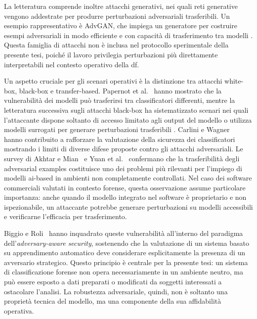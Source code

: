 La letteratura comprende inoltre attacchi generativi, nei quali reti generative
vengono addestrate per produrre perturbazioni adversariali trasferibili. Un
esempio rappresentativo è AdvGAN, che impiega un generatore per costruire esempi
adversariali in modo efficiente e con capacità di trasferimento tra modelli
\cite{xia2018advgan}. Questa famiglia di attacchi non è inclusa nel protocollo
sperimentale della presente tesi, poiché il lavoro privilegia perturbazioni più
direttamente interpretabili nel contesto operativo della \gls{df}.

Un aspetto cruciale per gli scenari operativi è la distinzione tra attacchi
white-box, black-box e transfer-based. Papernot et
al.~\cite{papernot2016limitations} hanno mostrato che la vulnerabilità dei
modelli può trasferirsi tra classificatori differenti, mentre la letteratura
successiva sugli attacchi black-box ha sistematizzato scenari nei quali
l'attaccante dispone soltanto di accesso limitato agli output del modello o
utilizza modelli surrogati per generare perturbazioni trasferibili
\cite{bhambri2020survey}. Carlini e Wagner~\cite{carlini2017towards} hanno
contribuito a rafforzare la valutazione della sicurezza dei classificatori
mostrando i limiti di diverse difese proposte contro gli attacchi
adversariali. Le survey di Akhtar e Mian~\cite{akhtar2018threat} e Yuan et
al.~\cite{yuan2019adversarial} confermano che la trasferibilità degli
adversarial examples costituisce uno dei problemi più rilevanti per l'impiego di
modelli \gls{ai}-based in ambienti non completamente controllati. Nel caso dei
software commerciali valutati in contesto forense, questa osservazione assume
particolare importanza: anche quando il modello integrato nel software è
proprietario e non ispezionabile, un attaccante potrebbe generare perturbazioni
su modelli accessibili e verificarne l'efficacia per trasferimento.

Biggio e Roli~\cite{biggio2018wild} hanno inquadrato queste vulnerabilità
all'interno del paradigma dell'\textit{adversary-aware security}, sostenendo che
la valutazione di un sistema basato su apprendimento automatico deve considerare
esplicitamente la presenza di un avversario strategico. Questo principio è
centrale per la presente tesi: un sistema di classificazione forense non opera
necessariamente in un ambiente neutro, ma può essere esposto a dati preparati o
modificati da soggetti interessati a ostacolare l'analisi. La robustezza
adversariale, quindi, non è soltanto una proprietà tecnica del modello, ma una
componente della sua affidabilità operativa.

